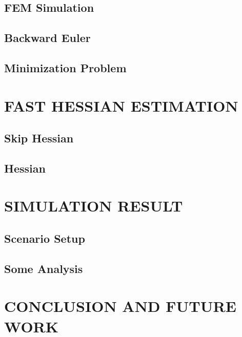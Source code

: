 \documentclass[
	11pt, 
	a4paper, 
	oneside,  
	final, 
]{report}
\begin{document}
\section{FEM Simulation}
\section{Backward Euler}
\section{Minimization Problem}
\chapter{FAST HESSIAN ESTIMATION}
\section{Skip Hessian}
\section{Hessian}
\chapter{SIMULATION RESULT}
\section{Scenario Setup}
\section{Some Analysis}
\chapter{CONCLUSION AND FUTURE WORK}




\end{document}
